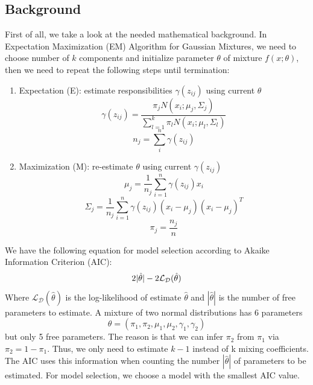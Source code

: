 \documentclass[abstract=true]{scrartcl}
\begin{document}
\subsection{Background}
First of all, we take a look at the needed mathematical background. In Expectation Maximization (EM) Algorithm for Gaussian Mixtures, we need to choose number of $k$ components and initialize parameter $\theta$ of mixture $f(x;\theta)$, then we need to repeat the following steps until termination:
\begin{enumerate}[Step 1:]
    \item Expectation (E): estimate responsibilities $\gamma(z_{ij})$ using current $\theta$
    \begin{equation}
    	\gamma(z_{ij}) = \frac{\pi_j N(x_i ; \mu_j, \Sigma_j)}{\sum_{l=1}^{k}\pi_l N(x_i ; \mu_l, \Sigma_l)}
    \end{equation}
    \begin{equation}
    	n_j = \sum_{i}^{n}\gamma(z_{ij})
    \end{equation}
    \item Maximization (M): re-estimate $\theta$ using current $\gamma(z_{ij})$
    \begin{equation}
    	\mu_j = \frac{1}{n_j} \sum_{i=1}^{n}\gamma(z_{ij})x_i
    \end{equation}
    \begin{equation}
    	\Sigma_j = \frac{1}{n_j} \sum_{i=1}^{n}\gamma(z_{ij})(x_i - \mu_j)(x_i - \mu_j)^T
    \end{equation}
    \begin{equation}
    	\pi_j = \frac{n_j}{n}
    \end{equation}
\end{enumerate}
We have the following equation for model selection according to Akaike Information Criterion (AIC):
\begin{equation}
    2|\hat{\theta}| - 2\mathcal{L_D}(\hat{\theta})
    \vspace{5px}
\end{equation}
Where $\mathcal{L_D}(\hat{\theta})$ is the log-likelihood of estimate $\hat{\theta}$ and $|\hat{\theta}|$ is the number of free parameters to estimate. A mixture of two normal distributions has 6 parameters
\begin{equation*}
    \theta = (\pi_1, \pi_2, \mu_1, \mu_2, \gamma_1, \gamma_2)
\end{equation*}
but only 5 free parameters. The reason is that we can infer $\pi_2$ from $\pi_1$ via $\pi_2 = 1 - \pi_1$. Thus, we only need to estimate $k-1$ instead of k mixing coefficients. The AIC uses this information when counting the number $|\hat{\theta}|$ of parameters to be estimated. For model selection, we choose a model with the smallest AIC value.
\end{document}

